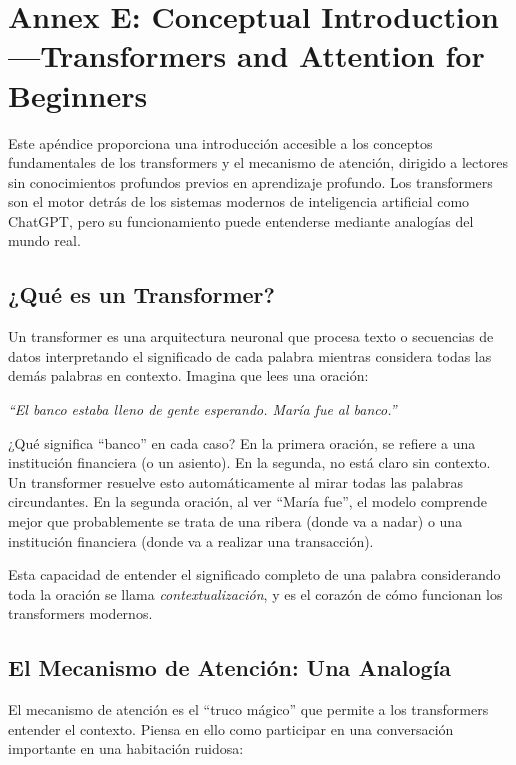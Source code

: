 \documentclass[11pt,a4paper]{article}
\begin{document}
\section{Annex E: Conceptual Introduction---Transformers and Attention for Beginners}
\label{sec:annex-tutorial}

Este apéndice proporciona una introducción accesible a los conceptos fundamentales de los transformers y el mecanismo de atención, dirigido a lectores sin conocimientos profundos previos en aprendizaje profundo. Los transformers son el motor detrás de los sistemas modernos de inteligencia artificial como ChatGPT, pero su funcionamiento puede entenderse mediante analogías del mundo real.

\subsection{¿Qué es un Transformer?}

Un transformer es una arquitectura neuronal que procesa texto o secuencias de datos interpretando el significado de cada palabra mientras considera todas las demás palabras en contexto. Imagina que lees una oración:

\begin{center}
\textit{``El banco estaba lleno de gente esperando. María fue al banco.''}
\end{center}

¿Qué significa ``banco'' en cada caso? En la primera oración, se refiere a una institución financiera (o un asiento). En la segunda, no está claro sin contexto. Un transformer resuelve esto automáticamente al mirar todas las palabras circundantes. En la segunda oración, al ver ``María fue'', el modelo comprende mejor que probablemente se trata de una ribera (donde va a nadar) o una institución financiera (donde va a realizar una transacción).

Esta capacidad de entender el significado completo de una palabra considerando toda la oración se llama \emph{contextualización}, y es el corazón de cómo funcionan los transformers modernos.

\subsection{El Mecanismo de Atención: Una Analogía}

El mecanismo de atención es el ``truco mágico'' que permite a los transformers entender el contexto. Piensa en ello como participar en una conversación importante en una habitación ruidosa:
\end{document}
